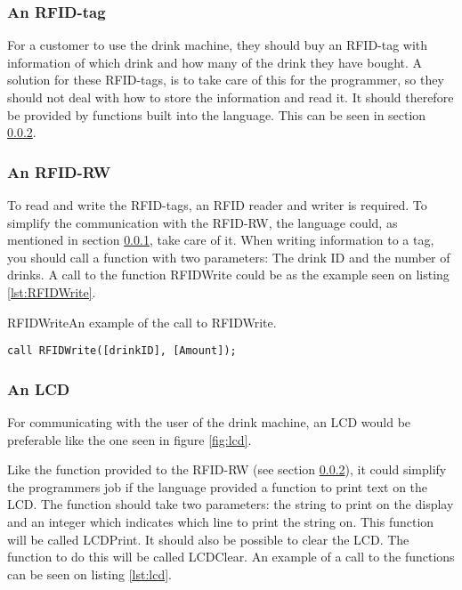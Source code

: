 \subsubsection{An RFID-tag}
\label{sec:RFIDtag}
For a customer to use the drink machine, they should buy an RFID-tag with information of which drink and how many of the drink they have bought. A solution for these RFID-tags, is to take care of this for the programmer, so they should not deal with how to store the information and read it. It should therefore be provided by functions built into the language. This can be seen in section \ref{sec:RFIDRW}.

\subsubsection{An RFID-RW}
\label{sec:RFIDRW}
To read and write the RFID-tags, an RFID reader and writer is required. To simplify the communication with the RFID-RW, the language could, as mentioned in section \ref{sec:RFIDtag}, take care of it. When writing information to a tag, you should call a function with two parameters: The drink ID and the number of drinks. A call to the function RFIDWrite could be as the example seen on listing \ref{lst:RFIDWrite}.

\begin{code}{RFIDWrite}{An example of the call to RFIDWrite.}
\begin{lstlisting}[mathescape]
call RFIDWrite([drinkID], [Amount]);
\end{lstlisting}
\end{code}

\subsubsection{An LCD}
For communicating with the user of the drink machine, an LCD would be preferable like the one seen in figure \ref{fig:lcd}.


Like the function provided to the RFID-RW (see section \ref{sec:RFIDRW}), it could simplify the programmers job if the language provided a function to print text on the LCD. The function should take two parameters: the string to print on the display and an integer which indicates which line to print the string on. This function will be called LCDPrint. It should also be possible to clear the LCD. The function to do this will be called LCDClear. An example of a call to the functions can be seen on listing \ref{lst:lcd}.

